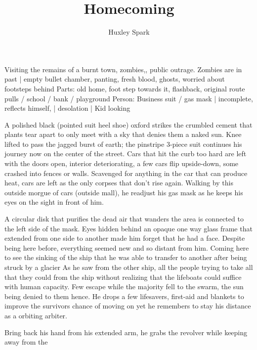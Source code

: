 \title{Homecoming}
\author{Huxley Spark}
\begin{Outline}
        Visiting the remains of a burnt town, zombies,, public outrage. Zombies are in past | empty bullet chamber, panting, fresh blood, ghosts, worried about
    footsteps behind
    Parts: old home, foot step towards it, flashback, original route pulls / school / bank / playground
    Person: Business suit / gas mask | incomplete, reflects himself, | desolation | Kid looking
\end{Outline}
\begin{Document}
        A polished black (pointed suit heel shoe) oxford strikes the crumbled cement that plants tear apart to only meet with a sky that denies them a naked
    sun. Knee lifted to pass the jagged burst of earth; the pinstripe 3-piece suit continues his journey now on the center of the street. Cars that hit the
    curb too hard are left with the doors open, interior deteriorating, a few cars flip upside-down, some crashed into fences or walls. Scavenged for anything
    in the car that can produce heat, cars are left as the only corpses that don't rise again. Walking by this outside morgue of cars  (outside mall), he
    readjust his gas mask as he keeps his eyes on the sight in front of him.

        A circular disk that purifies the dead air that wanders the area is connected to the left side of the mask. Eyes hidden behind an opaque one way glass
    frame that extended from one side to another made him forget that he had a face. Despite being here before, everything seemed new and so distant from him.
    Coming here to see the sinking of the ship that he was able to transfer to another after being struck by a glacier  As he saw from the other ship, all the
    people trying to take all that they could from the ship without realizing that the lifeboats could suffice with human capacity. Few escape while the majority
    fell to the swarm, the sun being denied to them hence. He drops a few lifesavers, first-aid and blankets to improve the survivors chance of moving on yet
    he remembers to stay his distance as a orbiting arbiter.

        Bring back his hand from his extended arm, he grabs the revolver while keeping away from the 
\end{Document}
